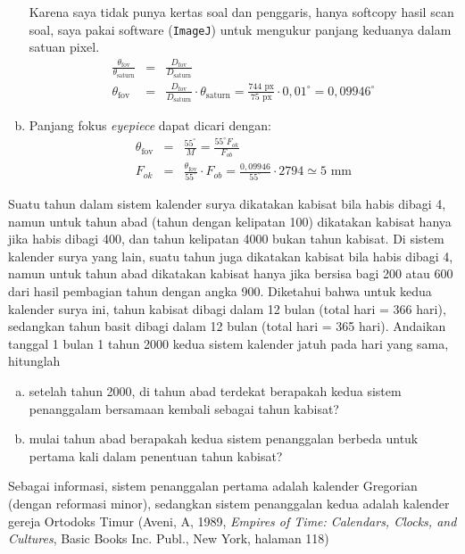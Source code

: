 \documentclass[11pt,fleqn]{exam}
\begin{document}
\begin{questions}
\begin{enumerate}[a.]
	Karena saya tidak punya kertas soal dan penggaris, hanya softcopy hasil scan soal, saya pakai software (\texttt{ImageJ}) untuk mengukur panjang keduanya dalam satuan pixel.
	\begin{eqnarray*}
	\frac{\theta_{\text{fov}}}{\theta_{\text{saturn}}} &=& \frac{D_{\text{fov}}}{D_{\text{saturn}}}\\
	\theta_{\text{fov}} &=&  \frac{D_{\text{fov}}}{D_{\text{saturn}}} \cdot \theta_{\text{saturn}}  = \frac{744 \text{ px}}{75 \text{ px}} \cdot 0,01^\circ = 0,09946^\circ
	\end{eqnarray*}
	\item Panjang fokus \textit{eyepiece} dapat dicari dengan:
	\begin{eqnarray*}
	\theta_\text{fov} &=& \frac{55^\circ}{M} = \frac{55^\circ F_{ok}}{F_{ob}}\\
	F_{ok} &=& \frac{\theta_\text{fov}}{55^\circ} \cdot F_{ob} =  \frac{0,09946}{55^\circ} \cdot 2794 \simeq 5 \text{  mm}
	\end{eqnarray*}
\end{enumerate}


\vspace{0.5cm}
\question Suatu tahun dalam sistem kalender surya dikatakan kabisat bila habis dibagi 4, namun untuk tahun abad (tahun dengan kelipatan 100) dikatakan kabisat hanya jika habis dibagi 400, dan tahun kelipatan 4000 bukan tahun kabisat. Di sistem kalender surya yang lain, suatu tahun juga dikatakan kabisat bila habis dibagi 4, namun untuk tahun abad dikatakan kabisat hanya jika bersisa bagi 200 atau 600 dari hasil pembagian tahun dengan angka 900. Diketahui bahwa untuk kedua kalender surya ini, tahun kabisat dibagi dalam 12 bulan (total hari = 366 hari), sedangkan tahun  basit dibagi dalam 12 bulan (total hari = 365 hari). Andaikan tanggal 1 bulan 1 tahun 2000 kedua sistem kalender jatuh pada hari yang sama, hitunglah
\begin{enumerate}[a.]
	\item setelah tahun 2000, di tahun abad terdekat berapakah kedua sistem penanggalam bersamaan kembali sebagai tahun kabisat?
	\item mulai tahun abad berapakah kedua sistem penanggalan berbeda untuk pertama kali dalam penentuan tahun kabisat?
\end{enumerate}
Sebagai informasi, sistem penanggalan pertama adalah kalender Gregorian (dengan reformasi minor), sedangkan sistem penanggalan kedua adalah kalender gereja Ortodoks Timur (Aveni, A, 1989, \textit{Empires of Time: Calendars, Clocks, and Cultures}, Basic Books Inc. Publ., New York, halaman 118)



\end{questions}
\end{document}
